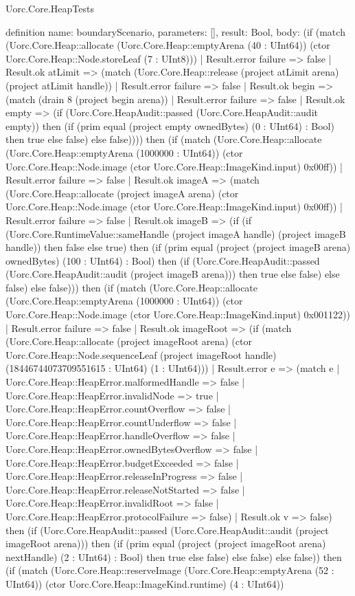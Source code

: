 \begin{lexlean}{Uorc.Core.HeapTests}
\begin{semanticmodule}
definition{
  name: boundaryScenario,
  parameters: [],
  result: Bool,
  body: (if (match (Uorc.Core.Heap::allocate (Uorc.Core.Heap::emptyArena (40 : UInt64)) (ctor Uorc.Core.Heap::Node.storeLeaf (7 : UInt8)))
    | Result.error failure => false
    | Result.ok atLimit => (match (Uorc.Core.Heap::release (project atLimit arena) (project atLimit handle))
      | Result.error failure => false
      | Result.ok begin => (match (drain 8 (project begin arena))
        | Result.error failure => false
        | Result.ok empty => (if (Uorc.Core.HeapAudit::passed (Uorc.Core.HeapAudit::audit empty)) then (if (prim equal (project empty ownedBytes) (0 : UInt64) : Bool) then true else false) else false)))) then (if (match (Uorc.Core.Heap::allocate (Uorc.Core.Heap::emptyArena (1000000 : UInt64)) (ctor Uorc.Core.Heap::Node.image (ctor Uorc.Core.Heap::ImageKind.input) 0x00ff))
    | Result.error failure => false
    | Result.ok imageA => (match (Uorc.Core.Heap::allocate (project imageA arena) (ctor Uorc.Core.Heap::Node.image (ctor Uorc.Core.Heap::ImageKind.input) 0x00ff))
      | Result.error failure => false
      | Result.ok imageB => (if (if (Uorc.Core.RuntimeValue::sameHandle (project imageA handle) (project imageB handle)) then false else true) then (if (prim equal (project (project imageB arena) ownedBytes) (100 : UInt64) : Bool) then (if (Uorc.Core.HeapAudit::passed (Uorc.Core.HeapAudit::audit (project imageB arena))) then true else false) else false) else false))) then (if (match (Uorc.Core.Heap::allocate (Uorc.Core.Heap::emptyArena (1000000 : UInt64)) (ctor Uorc.Core.Heap::Node.image (ctor Uorc.Core.Heap::ImageKind.input) 0x001122))
    | Result.error failure => false
    | Result.ok imageRoot => (if (match (Uorc.Core.Heap::allocate (project imageRoot arena) (ctor Uorc.Core.Heap::Node.sequenceLeaf (project imageRoot handle) (18446744073709551615 : UInt64) (1 : UInt64)))
      | Result.error e => (match e
        | Uorc.Core.Heap::HeapError.malformedHandle => false
        | Uorc.Core.Heap::HeapError.invalidNode => true
        | Uorc.Core.Heap::HeapError.countOverflow => false
        | Uorc.Core.Heap::HeapError.countUnderflow => false
        | Uorc.Core.Heap::HeapError.handleOverflow => false
        | Uorc.Core.Heap::HeapError.ownedBytesOverflow => false
        | Uorc.Core.Heap::HeapError.budgetExceeded => false
        | Uorc.Core.Heap::HeapError.releaseInProgress => false
        | Uorc.Core.Heap::HeapError.releaseNotStarted => false
        | Uorc.Core.Heap::HeapError.invalidRoot => false
        | Uorc.Core.Heap::HeapError.protocolFailure => false)
      | Result.ok v => false) then (if (Uorc.Core.HeapAudit::passed (Uorc.Core.HeapAudit::audit (project imageRoot arena))) then (if (prim equal (project (project imageRoot arena) nextHandle) (2 : UInt64) : Bool) then true else false) else false) else false)) then (if (match (Uorc.Core.Heap::reserveImage (Uorc.Core.Heap::emptyArena (52 : UInt64)) (ctor Uorc.Core.Heap::ImageKind.runtime) (4 : UInt64))
}
\end{semanticmodule}
\end{lexlean}
